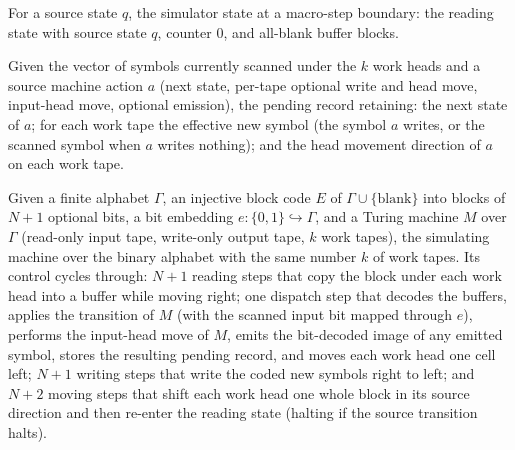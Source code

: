 \begin{definition}
\label{Turing.FinTM.arReady}
\leanok
{}
For a source state $q$, the simulator state at a macro-step boundary: the reading state
with source state $q$, counter $0$, and all-blank buffer blocks.
\end{definition}

\begin{definition}
\label{Turing.FinTM.arPending}
\leanok
{}
Given the vector of symbols currently scanned under the $k$ work heads and a source
machine action $a$ (next state, per-tape optional write and head move, input-head move,
optional emission), the pending record retaining: the next state of $a$; for each work
tape the effective new symbol (the symbol $a$ writes, or the scanned symbol when $a$
writes nothing); and the head movement direction of $a$ on each work tape.
\end{definition}

\begin{definition}
\label{Turing.FinTM.arTM}
\leanok
{}
Given a finite alphabet $\Gamma$, an injective block code $E$ of
$\Gamma \cup \{\text{blank}\}$ into blocks of $N+1$ optional bits, a bit embedding
$e : \{0,1\} \hookrightarrow \Gamma$, and a Turing machine $M$ over $\Gamma$ (read-only
input tape, write-only output tape, $k$ work tapes), the simulating machine over the
binary alphabet with the same number $k$ of work tapes. Its control cycles through:
$N+1$ reading steps that copy the block under each work head into a buffer while moving
right; one dispatch step that decodes the buffers, applies the transition of $M$ (with
the scanned input bit mapped through $e$), performs the input-head move of $M$, emits
the bit-decoded image of any emitted symbol, stores the resulting pending record, and
moves each work head one cell left; $N+1$ writing steps that write the coded new
symbols right to left; and $N+2$ moving steps that shift each work head one whole block
in its source direction and then re-enter the reading state (halting if the source
transition halts).
\end{definition}

